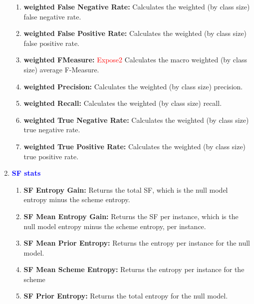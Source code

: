 \documentclass[a4paper,12pt, english]{article}
\begin{document}
\begin{enumerate}
\begin{enumerate}
\item \textbf{weighted False Negative Rate: }
          Calculates the weighted (by class size) false negative rate. 
          
\item \textbf{weighted False Positive Rate: }
          Calculates the weighted (by class size) false positive rate.                    

\item \textbf{weighted FMeasure: } \textcolor{red}{Expose2}
          Calculates the macro weighted (by class size) average F-Measure. 
                 
\item \textbf{weighted Precision: }
          Calculates the weighted (by class size) precision. 
                    
\item \textbf{weighted Recall: }
          Calculates the weighted (by class size) recall.          

\item \textbf{weighted True Negative Rate: }
          Calculates the weighted (by class size) true negative rate. 

\item \textbf{weighted True Positive Rate: }
          Calculates the weighted (by class size) true positive rate. 
\end{enumerate}
     

\item \textbf{\textcolor{blue}{SF stats}}
\begin{enumerate}
              
\item \textbf{SF Entropy Gain: }
          Returns the total SF, which is the null model entropy minus the scheme entropy.    
          

\item \textbf{SF Mean Entropy Gain: }
          Returns the SF per instance, which is the null model entropy minus the scheme entropy, per instance.         
          

\item \textbf{SF Mean Prior Entropy: }
          Returns the entropy per instance for the null model.       
          
\item \textbf{SF Mean Scheme Entropy: }
          Returns the entropy per instance for the scheme        


\item \textbf{SF Prior Entropy: }
          Returns the total entropy for the null model.
          

\end{enumerate}
\end{enumerate}
\end{document}
